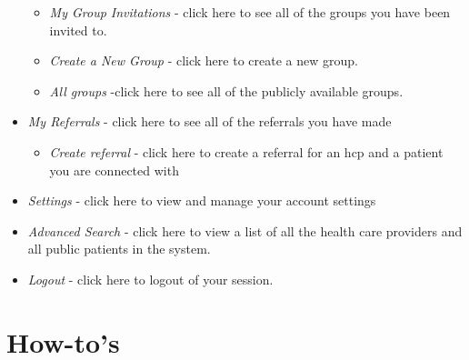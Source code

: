 \begin{itemize}
\begin{itemize}
\item \textit{My Group Invitations} - click here to see all of the groups you have been invited to.
\item \textit{Create a New Group} - click here to create a new group.
\item \textit{All groups} -click here to see all of the publicly available groups.
\end{itemize}
\item \textit{My Referrals} - click here to see all of the referrals you have made
\begin{itemize}
\item \textit{Create referral} - click here to create a referral for an hcp and a patient you are connected with
\end{itemize}
\item \textit{Settings} - click here to view and manage your account settings
\item \textit{Advanced Search} - click here to view a list of all the health care providers and all public patients in the system.
\item \textit{Logout} - click here to logout of your session.
\end{itemize}


\section{How-to's}

